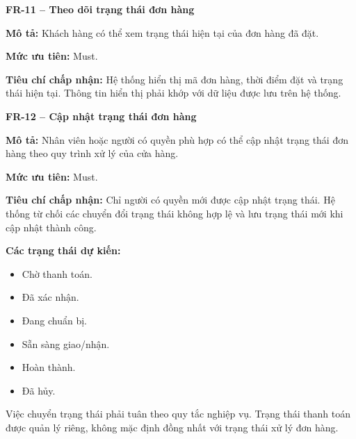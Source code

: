 \documentclass[a4paper]{article}
\begin{document}
\par\ifdim\dimexpr\pagegoal-\pagetotal\relax<6\baselineskip\newpage\fi
{}

\noindent\textbf{FR-11 – Theo dõi trạng thái đơn hàng}\par\nopagebreak
\begin{list}{}{%
    \setlength{\leftmargin}{0.8cm}%
    \setlength{\rightmargin}{0pt}%
    \setlength{\labelwidth}{0pt}%
    \setlength{\labelsep}{0pt}%
    \setlength{\itemindent}{0pt}%
    \setlength{\listparindent}{0pt}%
    \setlength{\itemsep}{5pt}%
    \setlength{\parsep}{0pt}%
    \setlength{\topsep}{5pt}%
}
\item[] \textbf{Mô tả:} Khách hàng có thể xem trạng thái hiện tại của đơn hàng đã đặt.
\item[] \textbf{Mức ưu tiên:} Must.
\item[] \textbf{Tiêu chí chấp nhận:} Hệ thống hiển thị mã đơn hàng, thời điểm đặt và trạng thái hiện tại. Thông tin hiển thị phải khớp với dữ liệu được lưu trên hệ thống.
\end{list}

\par\ifdim\dimexpr\pagegoal-\pagetotal\relax<6\baselineskip\newpage\fi
{}

\noindent\textbf{FR-12 – Cập nhật trạng thái đơn hàng}\par\nopagebreak
\begin{list}{}{%
    \setlength{\leftmargin}{0.8cm}%
    \setlength{\rightmargin}{0pt}%
    \setlength{\labelwidth}{0pt}%
    \setlength{\labelsep}{0pt}%
    \setlength{\itemindent}{0pt}%
    \setlength{\listparindent}{0pt}%
    \setlength{\itemsep}{5pt}%
    \setlength{\parsep}{0pt}%
    \setlength{\topsep}{5pt}%
}
\item[] \textbf{Mô tả:} Nhân viên hoặc người có quyền phù hợp có thể cập nhật trạng thái đơn hàng theo quy trình xử lý của cửa hàng.
\item[] \textbf{Mức ưu tiên:} Must.
\item[] \textbf{Tiêu chí chấp nhận:} Chỉ người có quyền mới được cập nhật trạng thái. Hệ thống từ chối các chuyển đổi trạng thái không hợp lệ và lưu trạng thái mới khi cập nhật thành công.
\item[] \textbf{Các trạng thái dự kiến:} 
\begin{itemize}
\item Chờ thanh toán.
\item Đã xác nhận.
\item Đang chuẩn bị.
\item Sẵn sàng giao/nhận.
\item Hoàn thành.
\item Đã hủy.
\end{itemize}
\par Việc chuyển trạng thái phải tuân theo quy tắc nghiệp vụ. Trạng thái thanh toán được quản lý riêng, không mặc định đồng nhất với trạng thái xử lý đơn hàng.
\end{list}
\end{document}
